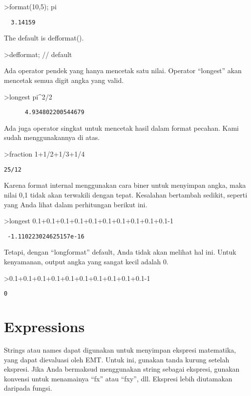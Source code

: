 \documentclass[
]{book}
\begin{document}
\textgreater format(10,5); pi

\begin{verbatim}
  3.14159 
\end{verbatim}

The default is defformat().

\textgreater defformat; // default

Ada operator pendek yang hanya mencetak satu nilai. Operator ``longest'' akan mencetak semua digit angka yang valid.

\textgreater longest pi\^{}2/2

\begin{verbatim}
      4.934802200544679 
\end{verbatim}

Ada juga operator singkat untuk mencetak hasil dalam format pecahan. Kami sudah menggunakannya di atas.

\textgreater fraction 1+1/2+1/3+1/4

\begin{verbatim}
25/12
\end{verbatim}

Karena format internal menggunakan cara biner untuk menyimpan angka, maka nilai 0,1 tidak akan terwakili dengan tepat. Kesalahan bertambah sedikit, seperti yang Anda lihat dalam perhitungan berikut ini.

\textgreater longest 0.1+0.1+0.1+0.1+0.1+0.1+0.1+0.1+0.1+0.1-1

\begin{verbatim}
 -1.110223024625157e-16 
\end{verbatim}

Tetapi, dengan ``longformat'' default, Anda tidak akan melihat hal ini. Untuk kenyamanan, output angka yang sangat kecil adalah 0.

\textgreater0.1+0.1+0.1+0.1+0.1+0.1+0.1+0.1+0.1+0.1-1

\begin{verbatim}
0
\end{verbatim}

\section{Expressions}\label{expressions}

Strings atau names dapat digunakan untuk menyimpan ekspresi matematika, yang dapat dievaluasi oleh EMT. Untuk ini, gunakan tanda kurung setelah ekspresi. Jika Anda bermaksud menggunakan string sebagai ekspresi, gunakan konvensi untuk menamainya ``fx'' atau ``fxy'', dll. Ekspresi lebih diutamakan daripada fungsi.
\end{document}
